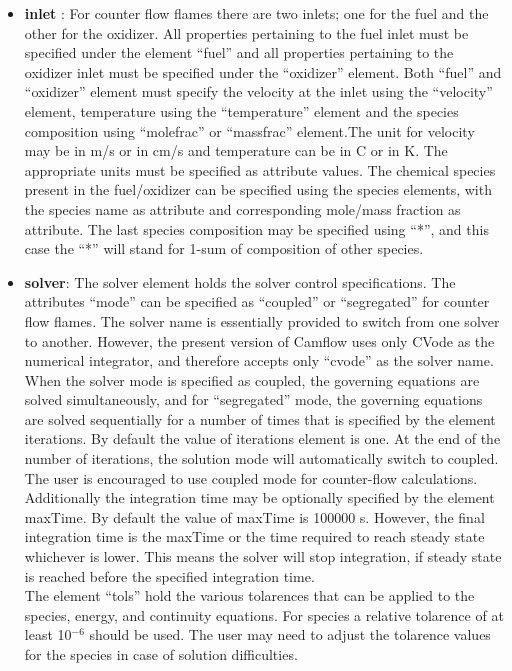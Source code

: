 \begin{itemize}
\item \textbf{inlet} : For counter flow flames there are two inlets; one for the fuel and the other for the oxidizer. All properties pertaining to the fuel inlet must be specified under the element ``fuel'' and all properties pertaining to the oxidizer inlet must be specified under the ``oxidizer'' element. Both ``fuel'' and ``oxidizer'' element must specify the velocity at the inlet using the ``velocity'' element, temperature using the ``temperature'' element and the species composition using ``molefrac'' or ``massfrac'' element.The unit for velocity may be in m/s or in cm/s and temperature can be in C or in K. The appropriate units must be specified as attribute values. The chemical species present in the fuel/oxidizer can be specified using the species elements, with the species name as attribute and corresponding mole/mass fraction as attribute. The last species composition may be specified using ``*'', and this case the ``*'' will stand for 1-sum of composition of other species. 

\item \textbf{solver}: The solver element holds the solver control specifications. The attributes ``mode'' can be specified as ``coupled'' or ``segregated'' for counter flow flames. The solver name is essentially provided to switch from one solver to another. However, the present version of Camflow uses only CVode as the numerical integrator, and therefore accepts only ``cvode'' as the solver name. When the solver mode is specified as coupled, the governing equations are solved simultaneously, and for ``segregated'' mode, the governing equations are solved sequentially for a number of times that is specified by the element iterations. By default the value of iterations element is one. At the end of the number of iterations, the solution mode will automatically switch to coupled. The user is encouraged to use coupled mode for counter-flow calculations.\\

Additionally the integration time may be optionally specified by the element maxTime. By default the value of maxTime is 100000 s. However, the final integration time is the maxTime or the time required to reach steady state whichever is lower. This means the solver will stop integration, if steady state is reached before the specified integration time.\\

The element ``tols'' hold the various tolarences that can be applied to the species, energy, and continuity equations. For species a relative tolarence of at least 10$^{-6}$ should be used. The user may need to adjust the tolarence values for the species in case of solution difficulties.


\end{itemize}
